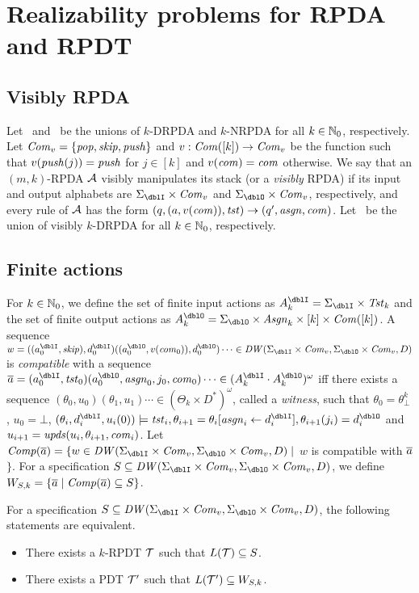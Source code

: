 \section{Realizability problems for RPDA and RPDT}
\subsection{Visibly RPDA}
Let \DRPDA\ and \NRPDA\ be the unions of $k$-DRPDA and $k$-NRPDA for all $k\in\mathbb{N}_0$, respectively.
Let $\mathit{Com}_v=\{\mathit{pop},\mathit{skip},\mathit{push}\}$ and $v:\mathit{Com}([k])\to\mathit{Com}_v$ be the function such that $v(\mathit{push}(j))=\mathit{push}$ for $j\in[k]$ and $v(\mathit{com})=\mathit{com}$ otherwise.
We say that an $(m,k)$-RPDA ${\cal A}$ visibly manipulates its stack (or a {\em visibly} RPDA) if its input and output alphabets are
$\Sigma_\dblI\times\Com_v$ and $\Sigma_\dblO\times\Com_v$, respectively,
and every rule of ${\cal A}$ has the form $(q,(a,v(\mathit{com})),\mathit{tst})\to(q',\mathit{asgn},\mathit{com})$.
Let \DRPDAv\ be the union of visibly $k$-DRPDA for all $k\in\mathbb{N}_0$, respectively.

\subsection{Finite actions}
For $k\in\mathbb{N}_0$,
we define the set of finite input actions as $A_k^\dblI = \Sigma_\dblI\times \Tst_k$
and the set of finite output actions as $A_k^\dblO = \Sigma_\dblO\times \Asgn_k\times [k]\times \Com([k])$.
A sequence $w = ((a^\dblI_0, \skip),d^\dblI_0) ((a^\dblO_0,v(\com_0)),d^\dblO_0)\cdots \in \DW(\Sigma_\dblI\times\Com_v,\Sigma_\dblO\times\Com_v,D)$ is \emph{compatible} with a sequence
$\overa = (a^\dblI_0, \tst_0)(a^\dblO_0,\asgn_0,j_0, \com_0)\cdots \in (A_k^\dblI\cdot A_k^\dblO)^\omega$
iff there exists a sequence $(\theta_0,u_0)(\theta_1, u_1)\cdots\in (\Theta_k\times D^*)^\omega$, called a \emph{witness}, such that
$\theta_0 = \theta^{k}_\bot$, $u_0 = \bot$,
$(\theta_i, d^\dblI_i, u_i(0)) \models \tst_i, \theta_{i+1}=\theta_i[\asgn_i\leftarrow d^\dblI_i], \theta_{i+1}(j_i) = d^\dblO_i$ and $u_{i+1}=\mathit{upds}(u_i,\theta_{i+1},\mathit{com}_i)$.
Let $\Comp(\overa) = \{w\in \DW(\Sigma_\dblI\times\Com_v,\Sigma_\dblO\times\Com_v,D)\mid$ $w$ is compatible with ${\overline{a}}$ $\}$.
For a specification $S \subseteq \DW(\Sigma_\dblI\times\Com_v,\Sigma_\dblO\times\Com_v,D)$, we define $W_{S,k}=\{{\overline{a}}\mid {\mathit{Comp}}({\overline{a}})\subseteq S\}$.

\begin{theorem}\label{the: finite_actions}
For a specification $S\subseteq \DW(\Sigma_\dblI\times\Com_v,\Sigma_\dblO\times\Com_v,D)$, the following statements are equivalent.
\begin{itemize}
\item There exists a $k$-RPDT ${\cal T}$ such that $L({\cal T})\subseteq S$.
\item There exists a PDT ${\cal T}'$ such that $L({\cal T}')\subseteq W_{S,k}$.
\end{itemize}
\end{theorem}


